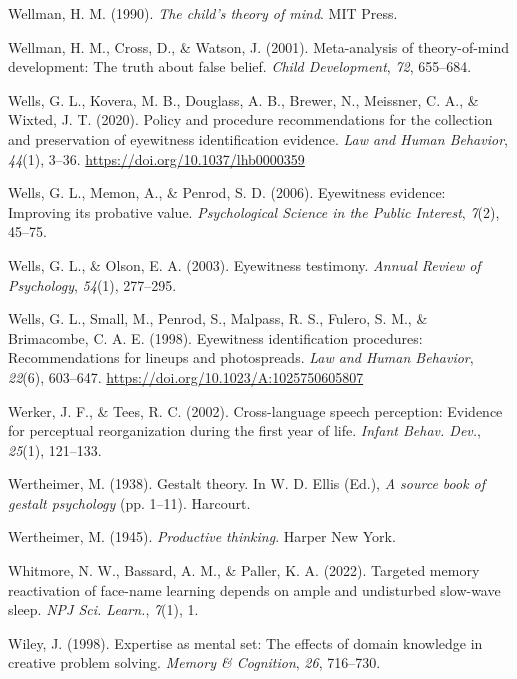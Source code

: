 \documentclass[
]{krantz}
\newlength{\cslhangindent}
\newenvironment{CSLReferences}[2] %
 {\begin{list}{}{%
  \setlength{\itemindent}{0pt}
  \setlength{\leftmargin}{0pt}
  \setlength{\parsep}{0pt}
  \ifodd #1
   \setlength{\leftmargin}{\cslhangindent}
   \setlength{\itemindent}{-1\cslhangindent}
  \fi
  \setlength{\itemsep}{#2\baselineskip}}}
 {\end{list}}
\begin{document}
\begin{CSLReferences}{1}{0}
Wellman, H. M. (1990). \emph{The child's theory of mind}. MIT Press.

Wellman, H. M., Cross, D., \& Watson, J. (2001). Meta-analysis of theory-of-mind development: The truth about false belief. \emph{Child Development}, \emph{72}, 655--684.

Wells, G. L., Kovera, M. B., Douglass, A. B., Brewer, N., Meissner, C. A., \& Wixted, J. T. (2020). Policy and procedure recommendations for the collection and preservation of eyewitness identification evidence. \emph{Law and Human Behavior}, \emph{44}(1), 3--36. \url{https://doi.org/10.1037/lhb0000359}

Wells, G. L., Memon, A., \& Penrod, S. D. (2006). Eyewitness evidence: Improving its probative value. \emph{Psychological Science in the Public Interest}, \emph{7}(2), 45--75.

Wells, G. L., \& Olson, E. A. (2003). Eyewitness testimony. \emph{Annual Review of Psychology}, \emph{54}(1), 277--295.

Wells, G. L., Small, M., Penrod, S., Malpass, R. S., Fulero, S. M., \& Brimacombe, C. A. E. (1998). Eyewitness identification procedures: Recommendations for lineups and photospreads. \emph{Law and Human Behavior}, \emph{22}(6), 603--647. \url{https://doi.org/10.1023/A:1025750605807}

Werker, J. F., \& Tees, R. C. (2002). Cross-language speech perception: Evidence for perceptual reorganization during the first year of life. \emph{Infant Behav. Dev.}, \emph{25}(1), 121--133.

Wertheimer, M. (1938). Gestalt theory. In W. D. Ellis (Ed.), \emph{A source book of gestalt psychology} (pp. 1--11). Harcourt.

Wertheimer, M. (1945). \emph{Productive thinking}. Harper New York.

Whitmore, N. W., Bassard, A. M., \& Paller, K. A. (2022). Targeted memory reactivation of face-name learning depends on ample and undisturbed slow-wave sleep. \emph{NPJ Sci. Learn.}, \emph{7}(1), 1.

Wiley, J. (1998). Expertise as mental set: The effects of domain knowledge in creative problem solving. \emph{Memory \& Cognition}, \emph{26}, 716--730.


\end{CSLReferences}
\end{document}
